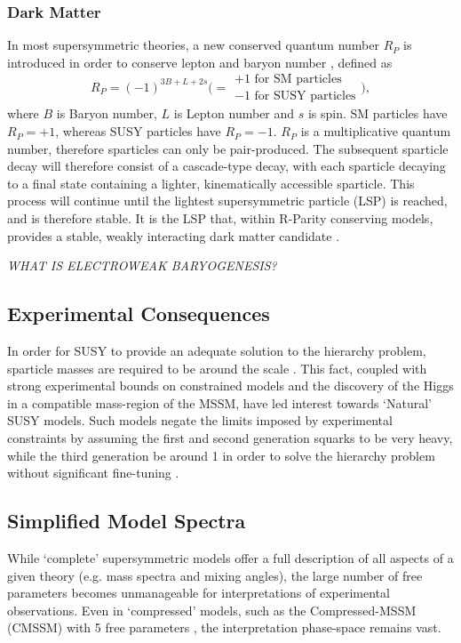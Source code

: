 \subsubsection{Dark Matter}
In most supersymmetric theories, a new conserved quantum number $R_P$
is introduced in order to conserve lepton and baryon number
\cite{Farrar1978575}, defined as
% 
\begin{equation}
R_P = (-1)^{3B+L+2s} \Bigg( =
\begin{array}{l} 
+1 \text{ for SM particles}\\ -1 \text{ for SUSY particles}
\end{array}\Bigg) ,
\end{equation}
% 
where $B$ is Baryon number, $L$ is Lepton number and $s$ is spin. SM particles
have $R_P = +1$, whereas SUSY particles have $R_P = -1$. $R_P$ is a
multiplicative quantum number, therefore sparticles
can only be pair-produced. The subsequent sparticle decay will therefore consist
of a cascade-type decay, with each sparticle decaying to a final state
containing a lighter, kinematically accessible sparticle. This process will
continue until the lightest supersymmetric particle (LSP) is reached, and is
therefore stable. It is the LSP that, within R-Parity conserving models,
provides a stable, weakly interacting dark matter candidate
\cite{Jungman:1995df}.

\emph{WHAT IS ELECTROWEAK BARYOGENESIS?}

\subsection{Experimental Consequences}
In order for SUSY to provide an adequate solution to the hierarchy problem,
sparticle masses are required to be around the \tev scale
\cite{ref:barbierinsusy,ref:hierarchy1,ref:hierarchy2}. This fact, coupled
with strong experimental bounds on constrained models and the discovery of
the Higgs in a compatible mass-region of the MSSM, have led interest
towards `Natural' SUSY models. Such models negate the limits imposed by
experimental constraints by assuming the first and second generation squarks to
be very heavy, while the third generation be around 1 \tev in order to solve
the hierarchy problem without significant fine-tuning \cite{Carena:2008rt}.

\subsection{Simplified Model Spectra}
While `complete' supersymmetric models offer a full description of all
aspects of a given theory (e.g. mass spectra and mixing angles), the large
number of free parameters becomes unmanageable for interpretations
of experimental observations. Even in `compressed' models, such as the
Compressed-MSSM (CMSSM) with 5
free parameters \cite{Kane:1993td}, the interpretation phase-space remains
vast.

